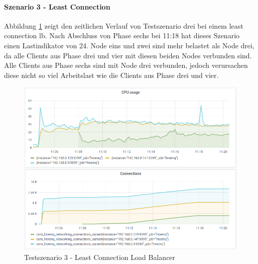\paragraph{Szenario 3 - Least Connection}
Abbildung \ref{fig:s3-lc} zeigt den zeitlichen Verlauf von Testszenario drei bei einem least connection \ac{lb}.
Nach Abschluss von Phase sechs bei 11:18 hat dieses Szenario einen Lastindikator von 24.
Node eins und zwei sind mehr belastet als Node drei, da alle Clients aus Phase drei und vier mit diesen beiden Nodes verbunden sind. Alle Clients aus Phase sechs sind mit Node drei verbunden, jedoch verursachen diese nicht so viel Arbeitslast wie die Clients aus Phase drei und vier.
\begin{figure}
    \centering
    \includegraphics[scale=0.8]{images/s3_lc.png}
    \caption{Testszenario 3 - Least Connection Load Balancer}
    \label{fig:s3-lc}
\end{figure}

